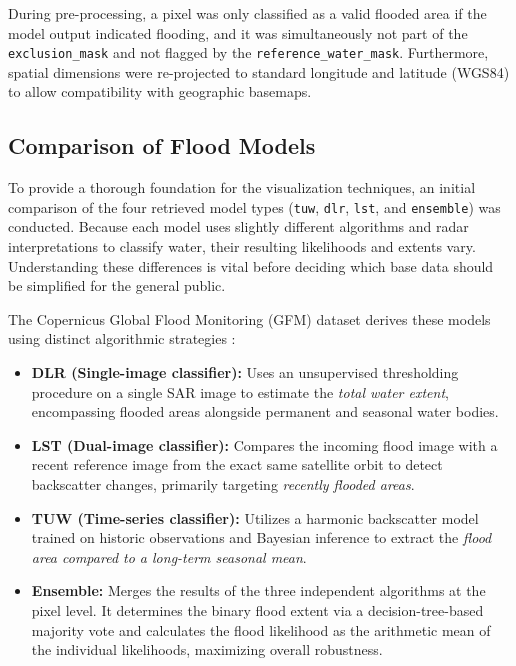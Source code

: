 \documentclass[11pt, a4paper]{article}
\begin{document}
During pre-processing, a pixel was only classified as a valid flooded area if the model output indicated flooding, and it was simultaneously not part of the \texttt{exclusion\_mask} and not flagged by the \texttt{reference\_water\_mask}. Furthermore, spatial dimensions were re-projected to standard longitude and latitude (WGS84) to allow compatibility with geographic basemaps.

\subsection{Comparison of Flood Models}
\label{subsec:model_comparison}
To provide a thorough foundation for the visualization techniques, an initial comparison of the four retrieved model types (\texttt{tuw}, \texttt{dlr}, \texttt{lst}, and \texttt{ensemble}) was conducted. Because each model uses slightly different algorithms and radar interpretations to classify water, their resulting likelihoods and extents vary. Understanding these differences is vital before deciding which base data should be simplified for the general public.

The Copernicus Global Flood Monitoring (GFM) dataset derives these models using distinct algorithmic strategies \cite{Wagner2026}:
\begin{itemize}
    \item \textbf{DLR (Single-image classifier):} Uses an unsupervised thresholding procedure on a single SAR image to estimate the \textit{total water extent}, encompassing flooded areas alongside permanent and seasonal water bodies.
    \item \textbf{LST (Dual-image classifier):} Compares the incoming flood image with a recent reference image from the exact same satellite orbit to detect backscatter changes, primarily targeting \textit{recently flooded areas}.
    \item \textbf{TUW (Time-series classifier):} Utilizes a harmonic backscatter model trained on historic observations and Bayesian inference to extract the \textit{flood area compared to a long-term seasonal mean}.
    \item \textbf{Ensemble:} Merges the results of the three independent algorithms at the pixel level. It determines the binary flood extent via a decision-tree-based majority vote and calculates the flood likelihood as the arithmetic mean of the individual likelihoods, maximizing overall robustness.
\end{itemize}
\end{document}
